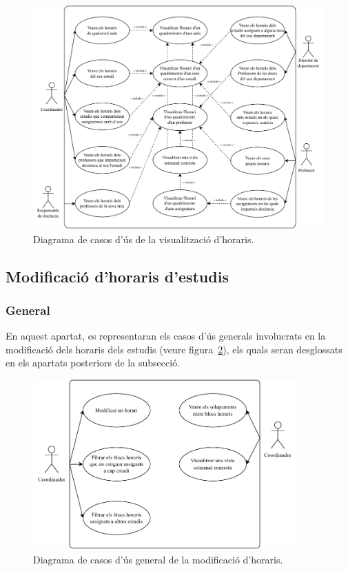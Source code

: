 \documentclass[a4paper,12pt]{ThesisStyle}
\begin{document}
\begin{figure}[H]
  \centering
  \includegraphics[width=\textwidth]{assets/use_cases/horaris/visualitzar.pdf}
  \caption{\label{img:casos_us_veure_horaris}Diagrama de casos d'ús de la visualització d'horaris.}
\end{figure}

\newpage

\subsection{Modificació d'horaris d'estudis}
\label{subsec:casos_us_modif_horaris}

\subsubsection{General}

En aquest apartat, es representaran els casos d'ús generals involucrats en la modificació dels horaris dels estudis (veure figura~\ref{img:casos_us_modif_horaris_general}), els quals seran desglossats en els apartats posteriors de la subsecció.

\begin{figure}[H]
  \centering
  \includegraphics[width=0.9\textwidth]{assets/use_cases/horaris/modificar/general.pdf}
  \caption{\label{img:casos_us_modif_horaris_general}Diagrama de casos d'ús general de la modificació d'horaris.}
\end{figure}
\end{document}
